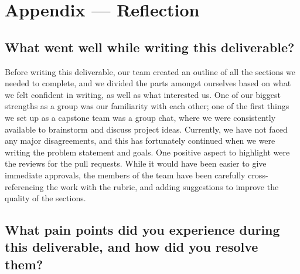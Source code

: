 \documentclass{article}
\begin{document}
\newpage{}




\newpage{}

\section*{Appendix --- Reflection}

\subsection*{What went well while writing this deliverable?}

Before writing this deliverable, our team created an outline of all the sections we needed to complete, 
and we divided the parts amongst ourselves based on what we felt confident in writing, as well as what interested us.
One of our biggest strengths as a group was our familiarity with each other; one of the first things 
we set up as a capstone team was a group chat, where we were consistently available to brainstorm and discuss project ideas. 
Currently, we have not faced any major disagreements, and this has fortunately continued when we were writing the problem statement and goals. 
One positive aspect to highlight were the reviews for the pull requests. While it would have been easier to give immediate approvals, 
the members of the team have been carefully cross-referencing the work with the rubric, and adding suggestions to 
improve the quality of the sections.

\subsection*{What pain points did you experience during this deliverable, and how did you resolve them?}
\end{document}
